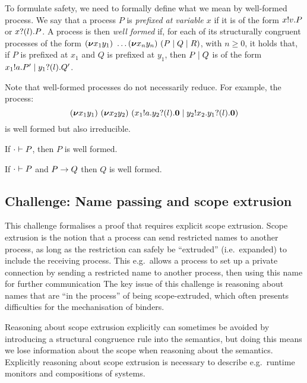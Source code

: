 \documentclass[runningheads]{llncs}
\begin{document}
To formulate safety, we need to formally define what we mean by well-formed process.
We say that a process \( P \) is \emph{prefixed at variable \( x \)} if it is of the form \( x ! v . P \) or \( x ? (l) . P \).
A process is then \emph{well formed} if, for each of its structurally congruent processes of the form \( (\bm{\nu} x_1y_1)~\dots (\bm{\nu} x_ny_n)~(P \mid Q \mid R) \), with \( n \geq 0 \), it holds that, if \( P \) is prefixed at \( x_1 \) and \( Q \) is prefixed at \( y_1 \), then \( P \mid Q \) is of the form \( x_1 ! a . P' \mid y_1 ? (l) . Q' \).

Note that well-formed processes do not necessarily reduce. For example, the process:
\begin{equation*}
  (\bm{\nu} x_1y_1)~(\bm{\nu} x_2y_2)~(x_1 ! a . y_2 ? (l) . \bm{0} \mid y_2 ! x_2 . y_1 ? (l) . \bm{0})
\end{equation*}
is well formed but also irreducible.

\begin{theorem}
  If \( \cdot \vdash P \), then \( P \) is well formed.
\end{theorem}

\begin{corollary}
  If \( \cdot \vdash P \) and \( P \rightarrow Q \) then \( Q \) is well formed.
\end{corollary}

\subsection{Challenge: Name passing and scope extrusion}
\label{sec:challenge:name-passing-scope-extrusion}

This challenge formalises a proof that requires explicit scope extrusion.
Scope extrusion is the notion that a process can send restricted names to another process, as long as the restriction can safely be ``extruded'' (i.e.\ expanded) to include the receiving process.
This e.g.\ allows a process to set up a private connection by sending a restricted name to another process, then using this name for further communication
The key issue of this challenge is reasoning about names that are ``in the process'' of being scope-extruded, which often presents difficulties for the mechanisation of binders.

Reasoning about scope extrusion explicitly can sometimes be avoided by introducing a structural congruence rule into the semantics, but doing this means we lose information about the scope when reasoning about the semantics.
Explicitly reasoning about scope extrusion is necessary to describe e.g.\ runtime monitors and compositions of systems.
\end{document}
